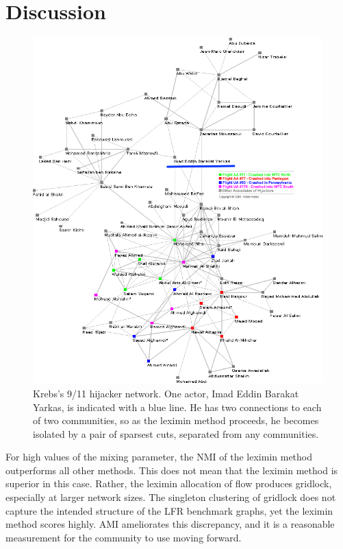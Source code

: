 \section{Discussion}

\begin{figure}
\centering
\includegraphics[height=0.4\textheight]{fig/krebs}
\caption{Krebs's 9/11 hijacker network. One actor, Imad Eddin Barakat Yarkas, is indicated with a blue line. He has two connections to each of two communities, so as the leximin method proceeds, he becomes isolated by a pair of sparsest cuts, separated from any communities.}
\label{fig:krebs}
\end{figure}

For high values of the mixing parameter, the NMI of the leximin method outperforms all other methods. This does not mean that the leximin method is superior in this case. Rather, the leximin allocation of flow produces gridlock, especially at larger network sizes. The singleton clustering of gridlock does not capture the intended structure of the LFR benchmark graphs, yet the leximin method scores highly. AMI ameliorates this discrepancy, and it is a reasonable measurement for the community to use moving forward. 

